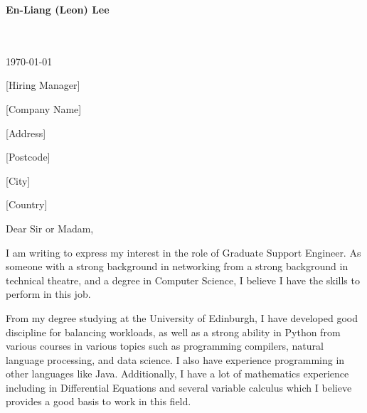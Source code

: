 \documentclass[10pt,english]{article}
\begin{document}
\setlength{\columnsep}{2.2em}
\setlength{\columnseprule}{4pt}



\newpage

\setlength{\columnsep}{2.2em}
\setlength{\columnseprule}{4pt}

\begin{minipage}[c][2.5cm][c]{1\mpwidth}
	\LARGE{\textbf{\textcolor{maincol}{En-Liang (Leon) Lee}}} \\[2pt]
	\normalsize{}\\
	\\
\end{minipage}

\bigskip

\begin{minipage}[c][2.5cm][c]{1\mpwidth}
	\today
	\bigskip

	[Hiring Manager]

	[Company Name]

	[Address]

	[Postcode]

	[City]

	[Country]
\end{minipage}
\bigskip\bigskip

Dear Sir or Madam,
\medskip

I am writing to express my interest in the role of Graduate Support Engineer. As someone with a strong background in networking from a strong background in technical theatre, and a degree in Computer Science, I believe I have the skills to perform in this job.

\medskip

From my degree studying at the University of Edinburgh, I have developed good discipline for balancing workloads, as well as a strong ability in Python from various courses in various topics such as programming compilers, natural language processing, and data science. I also have experience programming in other languages like Java. Additionally, I have a lot of mathematics experience including in Differential Equations and several variable calculus which I believe provides a good basis to work in this field.
\end{document}
